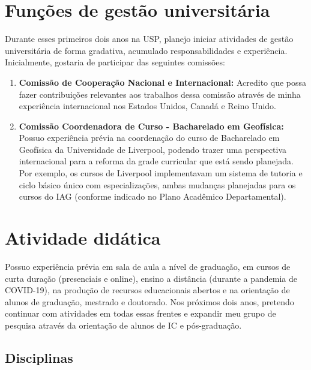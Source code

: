 \documentclass[12pt,a4paper,oneside]{book}
\begin{document}
\chapter{Funções de gestão universitária}

Durante esses primeiros dois anos na USP, planejo iniciar atividades de gestão
universitária de forma gradativa, acumulado responsabilidades e experiência.
Inicialmente, gostaria de participar das seguintes comissões:

\begin{enumerate}
  \item \textbf{Comissão de Cooperação Nacional e Internacional:} Acredito que
    possa fazer contribuições relevantes aos trabalhos dessa comissão através
    de minha experiência internacional nos Estados Unidos, Canadá e Reino
    Unido.
  \item \textbf{Comissão Coordenadora de Curso - Bacharelado em Geofísica:}
    Possuo experiência prévia na coordenação do curso de Bacharelado em
    Geofísica da Universidade de Liverpool, podendo trazer uma perspectiva
    internacional para a reforma da grade curricular que está sendo planejada.
    Por exemplo, os cursos de Liverpool implementavam um sistema de tutoria e
    ciclo básico único com especializações, ambas mudanças planejadas para os
    cursos do IAG (conforme indicado no Plano Acadêmico Departamental).
\end{enumerate}



\chapter{Atividade didática}

Possuo experiência prévia em sala de aula a nível de graduação, em cursos de
curta duração (presenciais e online), ensino a distância (durante a pandemia de
COVID-19), na produção de recursos educacionais abertos e na orientação de
alunos de graduação, mestrado e doutorado.
Nos próximos dois anos, pretendo continuar com atividades em todas essas
frentes e expandir meu grupo de pesquisa através da orientação de alunos de
IC e pós-graduação.

\section{Disciplinas}
\end{document}
